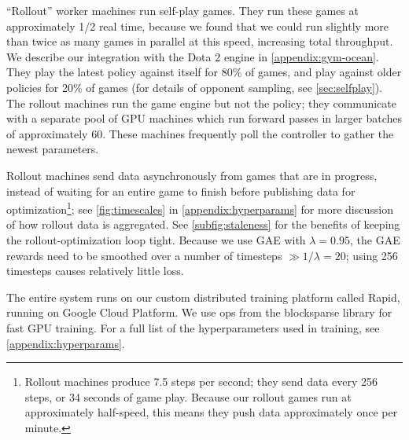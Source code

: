 \documentclass[11pt]{article}
\newcommand{\dota}{Dota 2\xspace}
\begin{document}
``Rollout'' worker machines run self-play games.
They run these games at approximately 1/2 real time, because we found that we could run slightly more than twice as many games in parallel at this speed, increasing total throughput.
We describe our integration with the \dota engine in \autoref{appendix:gym-ocean}.
They play the latest policy against itself for 80\% of games, and play against older policies for 20\% of games (for details of opponent sampling, see \autoref{sec:selfplay}).
The rollout machines run the game engine but not the policy; they communicate with a separate pool of GPU machines which run forward passes in larger batches of approximately 60. 
These machines frequently poll the controller to gather the newest parameters.

Rollout machines send data asynchronously from games that are in progress, instead of waiting for an entire game to finish before publishing data for optimization\footnote{Rollout machines produce 7.5 steps per second; they send data every 256 steps, or 34 seconds of game play. 
Because our rollout games run at approximately half-speed, this means they push data approximately once per minute.}; see \autoref{fig:timescales} in \autoref{appendix:hyperparams} for more discussion of how rollout data is aggregated.
See \autoref{subfig:staleness} for the benefits of keeping the rollout-optimization loop tight.
Because we use GAE with $\lambda=0.95$, the GAE rewards need to be smoothed over a number of timesteps $\gg1/\lambda=20$; using 256 timesteps causes relatively little loss.

The entire system runs on our %
custom distributed training platform called Rapid\cite{dactyl}, running on Google Cloud Platform.
We use ops from the blocksparse library for fast GPU training\cite{gray2017blocksparse}.
For a full list of the hyperparameters used in training, see \autoref{appendix:hyperparams}.
\end{document}
